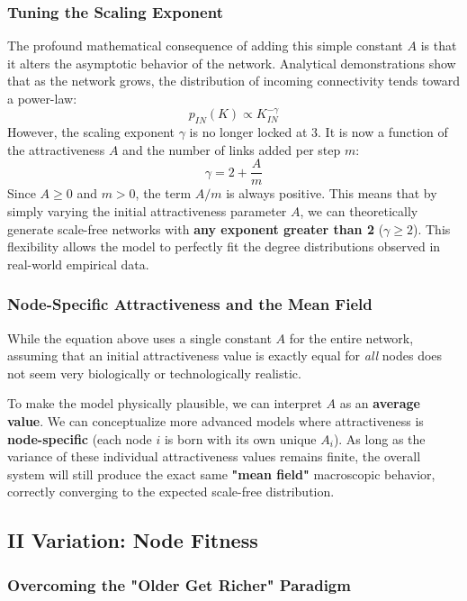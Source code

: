 \subsubsection{Tuning the Scaling Exponent}

The profound mathematical consequence of adding this simple constant \( A \) is that it alters the asymptotic behavior of the network. Analytical demonstrations show that as the network grows, the distribution of incoming connectivity tends toward a power-law:
\[
    p_{IN}(K) \propto K_{IN}^{-\gamma}
\]
However, the scaling exponent \( \gamma \) is no longer locked at 3. It is now a function of the attractiveness \( A \) and the number of links added per step \( m \):
\[
    \gamma = 2 + \frac{A}{m}
\]
Since \( A \geq 0 \) and \( m > 0 \), the term \( A/m \) is always positive. This means that by simply varying the initial attractiveness parameter \( A \), we can theoretically generate scale-free networks with \textbf{any exponent greater than 2} (\( \gamma \geq 2 \)). This flexibility allows the model to perfectly fit the degree distributions observed in real-world empirical data.

\subsubsection{Node-Specific Attractiveness and the Mean Field}
While the equation above uses a single constant \( A \) for the entire network, assuming that an initial attractiveness value is exactly equal for \textit{all} nodes does not seem very biologically or technologically realistic.

To make the model physically plausible, we can interpret \( A \) as an \textbf{average value}. We can conceptualize more advanced models where attractiveness is \textbf{node-specific} (each node \( i \) is born with its own unique \( A_i \)). As long as the variance of these individual attractiveness values remains finite, the overall system will still produce the exact same \textbf{"mean field"} macroscopic behavior, correctly converging to the expected scale-free distribution.

\subsection{II Variation: Node Fitness}

\subsubsection{Overcoming the "Older Get Richer" Paradigm}


